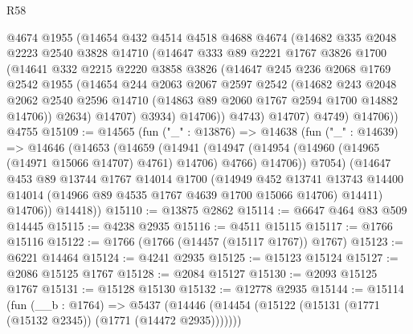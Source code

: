 \begin{lexlean}{R58}
\begin{coremodule}
            @4674
            @1955
            (@14654
              @432
              @4514
              @4518
              @4688
              @4674
              (@14682
                @335
                @2048
                @2223
                @2540
                @3828
                @14710
                (@14647
                  @333
                  @89
                  @2221
                  @1767
                  @3826
                  @1700
                  (@14641
                    @332
                    @2215
                    @2220
                    @3858
                    @3826
                    (@14647
                      @245
                      @236
                      @2068
                      @1769
                      @2542
                      @1955
                      (@14654
                        @244
                        @2063
                        @2067
                        @2597
                        @2542
                        (@14682
                          @243
                          @2048
                          @2062
                          @2540
                          @2596
                          @14710
                          (@14863 @89 @2060 @1767 @2594 @1700 @14882 @14706))
                        @2634)
                      @14707)
                    @3934)
                  @14706))
              @4743)
            @14707)
          @4749)
        @14706))
    @4755
@15109 := @14565
    (fun ("_" : @13876) =>
    @14638
      (fun ("_" : @14639) =>
      @14646
        (@14653
          (@14659
            (@14941
              (@14947 (@14954 (@14960 (@14965 (@14971 @15066 @14707) @4761) @14706) @4766) @14706))
            @7054)
          (@14647
            @453
            @89
            @13744
            @1767
            @14014
            @1700
            (@14949
              @452
              @13741
              @13743
              @14400
              @14014
              (@14966 @89 @4535 @1767 @4639 @1700 @15066 @14706)
              @14411)
            @14706))
        @14418))
@15110 := @13875 @2862
@15114 := @6647 @464 @83 @509 @14445
@15115 := @4238 @2935
@15116 := @4511 @15115
@15117 := @1766 @15116
@15122 := @1766 (@1766 (@14457 (@15117 @1767)) @1767)
@15123 := @6221 @14464
@15124 := @4241 @2935
@15125 := @15123 @15124
@15127 := @2086 @15125 @1767
@15128 := @2084 @15127
@15130 := @2093 @15125 @1767
@15131 := @15128 @15130
@15132 := @12778 @2935
@15144 := @15114
    (fun (__b : @1764) =>
    @5437 (@14446 (@14454 (@15122 (@15131 (@1771 (@15132 @2345)) (@1771 (@14472 @2935)))))))

\end{coremodule}
\end{lexlean}
